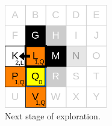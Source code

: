 \begin{figure}[th]
    \centering
    \includegraphics[width=0.4\textwidth]{Figures/grid_map_expansion_03.png}
    \decoRule
    \caption[]{Next stage of exploration.}
    \label{fig:NextNodeExploration4Node}
\end{figure}






